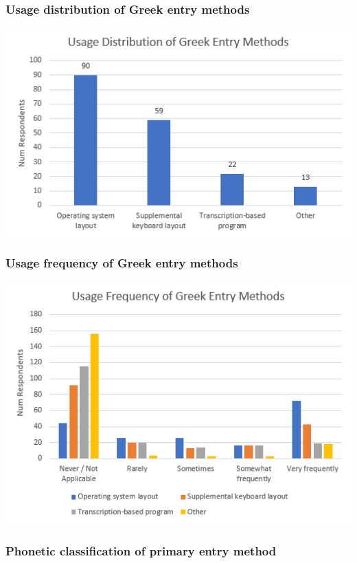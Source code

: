 \documentclass[11pt]{article}
\begin{document}
\subsubsection{Usage distribution of Greek entry methods}
\label{sec:orgb18d087}

\begin{center}
\includegraphics[width=.9\linewidth]{./images/entry-methods.PNG}
\end{center}

\subsubsection{Usage frequency of Greek entry methods}
\label{sec:org299e097}

\begin{center}
\includegraphics[width=.9\linewidth]{./images/entry-method-usage-distribution.PNG}
\end{center}

\subsubsection{Phonetic classification of primary entry method}
\label{sec:orga916eb4}
\end{document}
